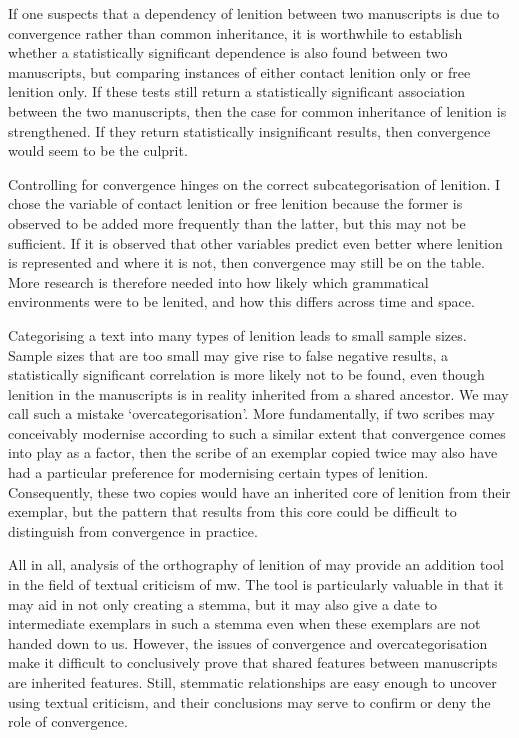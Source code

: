 If one suspects that a dependency of lenition between two manuscripts is due to convergence rather than common inheritance, it is worthwhile to establish whether a statistically significant dependence is also found between two manuscripts, but comparing instances of either contact lenition only or free lenition only. If these tests still return a statistically significant association between the two manuscripts, then the case for common inheritance of lenition is strengthened. If they return statistically insignificant results, then convergence would seem to be the culprit.

Controlling for convergence hinges on the correct subcategorisation of lenition. I chose the variable of contact lenition or free lenition because the former is observed to be added more frequently than the latter, but this may not be sufficient. If it is observed that other variables predict even better where lenition is represented and where it is not, then convergence may still be on the table. More research is therefore needed into how likely which grammatical environments were to be lenited, and how this differs across time and space.

Categorising a text into many types of lenition leads to small sample sizes. Sample sizes that are too small may give rise to false negative results, \ie a statistically significant correlation is more likely not to be found, even though lenition in the manuscripts is in reality inherited from a shared ancestor. We may call such a mistake `overcategorisation'. More fundamentally, if two scribes may conceivably modernise according to such a similar extent that convergence comes into play as a factor, then the scribe of an exemplar copied twice may also have had a particular preference for modernising certain types of lenition. Consequently, these two copies would have an inherited core of lenition from their exemplar, but the pattern that results from this core could be difficult to distinguish from convergence in practice.

All in all, analysis of the orthography of lenition of  may provide an addition tool in the field of textual criticism of \gls{mw}. The tool is particularly valuable in that it may aid in not only creating a stemma, but it may also give a date to intermediate exemplars in such a stemma even when these exemplars are not handed down to us. However, the issues of convergence and overcategorisation make it difficult to conclusively prove that shared features between manuscripts are inherited features. Still, stemmatic relationships are easy enough to uncover using textual criticism, and their conclusions may serve to confirm or deny the role of convergence.

